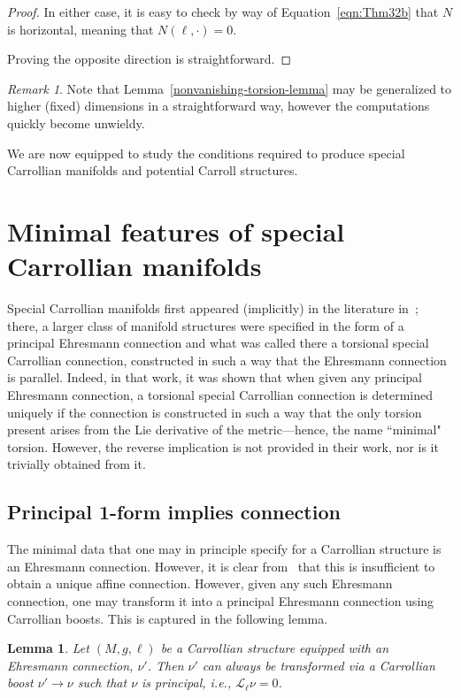 \documentclass{article}
\newtheorem{lemma}[theorem]{Lemma}
\theoremstyle{definition}
\theoremstyle{remark}
\newtheorem{remark}[theorem]{Remark}
\begin{document}
\begin{proof}
    In either case, it is easy to check by way of Equation~\ref{eqn:Thm32b} that $N$ is horizontal, meaning that $N(\ell,\cdot) = 0$.
    
    Proving the opposite direction is straightforward.

    \end{proof}

    \begin{remark}
        Note that Lemma~\ref{nonvanishing-torsion-lemma} may be generalized to higher (fixed) dimensions in a straightforward way, however the computations quickly become unwieldy.
    \end{remark}

    We are now equipped to study the conditions required to produce special Carrollian manifolds and potential Carroll structures.

\section{Minimal features of special Carrollian manifolds}\label{sec:SCMs}

Special Carrollian manifolds first appeared (implicitly) in the literature in~\cite{bekaert2018connections}; there, a larger class of manifold structures were specified in the form of a principal Ehresmann connection and what was called there a torsional special Carrollian connection, constructed in such a way that the Ehresmann connection is parallel. Indeed, in that work, it was shown that when given any principal Ehresmann connection, a torsional special Carrollian connection is determined uniquely if the connection is constructed in such a way that the only torsion present arises from the Lie derivative of the metric---hence, the name ``minimal" torsion. However, the reverse implication is not provided in their work, nor is it trivially obtained from it.

\subsection{Principal 1-form implies connection} \label{sec:SCM-1form-con}
The minimal data that one may in principle specify for a Carrollian structure is an Ehresmann connection. However, it is clear from~\cite{bekaert2018connections} that this is insufficient to obtain a unique affine connection. However, given any such Ehresmann connection, one may transform it into a principal Ehresmann connection using Carrollian boosts. This is captured in the following lemma.
\begin{lemma}
Let $(M,g, \ell)$ be a Carrollian structure equipped with an Ehresmann connection, $\nu'$. Then $\nu'$ can always be transformed via a Carrollian boost $\nu' \to \nu$  such that $\nu$ is principal, i.e., $\mathcal{L}_{\ell} \nu = 0$.
\end{lemma}
\end{document}
